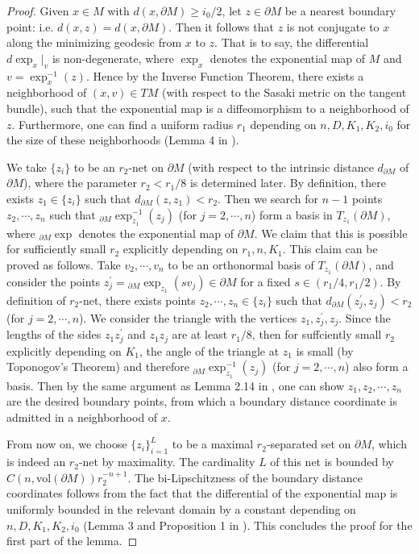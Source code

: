 \documentclass[11pt,letterpaper]{amsart}
\numberwithin{equation}{section}
\theoremstyle{definition}
\theoremstyle{plain}
\theoremstyle{definition}
\theoremstyle{plain}
\theoremstyle{definition}
\theoremstyle{plain}
\newcommand{\vol}{\textrm{vol}}
\begin{document}
\begin{proof}
Given $x\in M$ with $d(x,\partial M)\geqslant i_0/2$, let $z\in \partial M$ be a nearest boundary point: i.e. $d(x,z)=d(x,\partial M)$. Then it follows that $z$ is not conjugate to $x$ along the minimizing geodesic from $x$ to $z$. That is to say, the differential $d\exp_x |_v$ is non-degenerate, where $\exp_x$ denotes the exponential map of $M$ and $v=\exp_x^{-1}(z)$. Hence by the Inverse Function Theorem, there exists a neighborhood of $(x,v)\in TM$ (with respect to the Sasaki metric on the tangent bundle), such that the exponential map is a diffeomorphism to a neighborhood of $z$. Furthermore, one can find a uniform radius $r_1$ depending on $n,D,K_1,K_2,i_0$ for the size of these neighborhoods (Lemma 4 in \cite{KKL2}).

We take $\{z_i\}$ to be an $r_2$-net on $\partial M$ (with respect to the intrinsic distance $d_{\partial M}$ of $\partial M$), where the parameter $r_2<r_1/8$ is determined later. By definition, there exists $z_1\in \{z_i\}$ such that $d_{\partial M}(z,z_1)<r_2$. Then we search for $n-1$ points $z_2,\cdots,z_n$ such that ${}_{\partial M}{\exp}_{z_1}^{-1}(z_j)$ (for $j=2,\cdots,n$) form a basis in $T_{z_1}(\partial M)$, where  ${}_{\partial M}{\exp}$ denotes the exponential map of $\partial M$. We claim that this is possible for sufficiently small $r_2$ explicitly depending on $r_1,n,K_1$. This claim can be proved as follows. Take $v_2,\cdots,v_n$ to be an orthonormal basis of $T_{z_1}(\partial M)$, and consider the points $z_{j}^{\prime}={}_{\partial M}{\exp}_{z_1} (s v_j)\in \partial M$ for a fixed $s\in (r_1/4,r_1/2)$. By definition of $r_2$-net, there exists points $z_2,\cdots,z_n\in \{z_i\}$ such that $d_{\partial M}(z_j^{\prime},z_j)<r_2$ (for $j=2,\cdots,n$). We consider the triangle with the vertices $z_1,z_j^{\prime},z_j$. Since the lengths of the sides $z_1 z_j^{\prime}$ and $z_1 z_j$ are at least $r_1/8$, then for suffciently small $r_2$ explicitly depending on $K_1$, the angle of the triangle at $z_1$ is small (by Toponogov's Theorem) and therefore ${}_{\partial M}{\exp}_{z_1}^{-1}(z_j)$ (for $j=2,\cdots,n$) also form a basis. Then by the same argument as Lemma 2.14 in \cite{KKL}, one can show $z_1,z_2,\cdots,z_n$ are the desired boundary points, from which a boundary distance coordinate is admitted in a neighborhood of $x$.

From now on, we choose $\{z_i\}_{i=1}^L$ to be a maximal $r_2$-separated set on $\partial M$, which is indeed an $r_2$-net by maximality. The cardinality $L$ of this net is bounded by $C(n,\vol(\partial M))r_2^{-n+1}$. The bi-Lipschitzness of the boundary distance coordinates follows from the fact that the differential of the exponential map is uniformly bounded in the relevant domain by a constant depending on $n,D,K_1,K_2,i_0$ (Lemma 3 and Proposition 1 in \cite{KKL2}). This concludes the proof for the first part of the lemma.


\end{proof}
\end{document}
